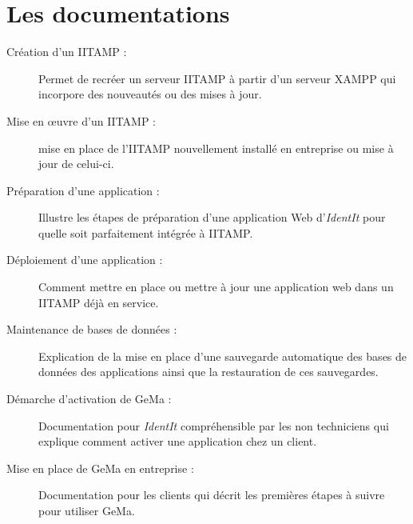 \section{Les documentations} %
\label{sec:Les documentations}

\begin{description}

  \item[Création d'un IITAMP :] Permet de recréer un serveur IITAMP à
    partir d'un serveur XAMPP qui incorpore des nouveautés ou des mises
    à jour.

  \item[Mise en \oe{}uvre d'un IITAMP :] mise en place de l'IITAMP
    nouvellement installé en entreprise ou mise à jour de celui-ci.

  \item[Préparation d'une application :] Illustre les étapes de
    préparation d'une application Web d'\emph{IdentIt} pour quelle soit
    parfaitement intégrée à IITAMP.

  \item[Déploiement d'une application :] Comment mettre en place ou
    mettre à jour une application web dans un IITAMP déjà en service.

  \item[Maintenance de bases de données :] Explication de la mise en
    place d'une sauvegarde automatique des bases de données des
    applications ainsi que la restauration de ces sauvegardes.

  \item[Démarche d'activation de GeMa :] Documentation pour
    \emph{IdentIt} compréhensible par les non techniciens qui explique
    comment activer une application chez un client.

  \item[Mise en place de GeMa en entreprise :] Documentation pour les
    clients qui décrit les premières étapes à suivre pour utiliser GeMa.

\end{description}
